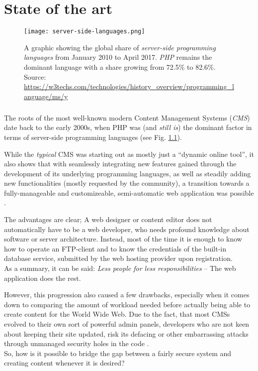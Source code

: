 \chapter{State of the art}
\label{cha:state-of-the-art}

\begin{figure}
    \centering
    \texttt{[image: server-side-languages.png]}
    \caption{A graphic showing the global share of \emph{server-side programming languages} from January 2010 to April 2017. \emph{PHP} remains the dominant language with a share growing from 72.5\% to 82.6\%.\\
    Source: \url{https://w3techs.com/technologies/history_overview/programming_language/ms/y}}
    \label{fig:server-side-languages}
\end{figure}
%

\paragraph{} %
The roots of the most well-known modern Content Management Systems (\emph{CMS}) date back to the early 2000s, when PHP was (and \emph{still is}) the dominant factor in terms of server-side programming languages (see Fig. \ref{fig:server-side-languages}). %

While the \emph{typical} CMS was starting out as mostly just a ``dynamic online tool'', it also shows that with seamlessly integrating new features gained through the development of its underlying programming languages, as well as steadily adding new functionalities (mostly requested by the community), a transition towards a fully-manageable and customizeable, semi-automatic web application was possible \cite[17]{dhillon2016}.

The advantages are clear; A web designer or content editor does not automatically have to be a web developer, who needs profound knowledge about software or server architecture. Instead, most of the time it is enough to know how to operate an FTP-client and to know the credentials of the built-in database service, submitted by the web hosting provider upon registration.\\
As a summary, it can be said: \emph{Less people for less responsibilities} -- The web application does the rest.

However, this progression also caused a few drawbacks, especially when it comes down to comparing the amount of workload needed before actually being able to create content for the World Wide Web. Due to the fact, that most CMSs evolved to their own sort of powerful admin panels, developers who are not keen about keeping their site updated, risk its defacing or other embarrassing attacks through unmanaged security holes in the code \cite[23]{dhillon2016}.\\
So, how is it possible to bridge the gap between a fairly secure system and creating content whenever it is desired?

